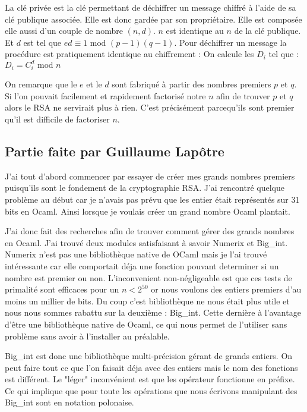 \documentclass[a4paper,12pt]{article}
\begin{document}
		La clé privée est la clé permettant de déchiffrer un message chiffré à l'aide de sa clé publique associée. Elle est donc gardée par son propriétaire. Elle est composée elle aussi d'un couple de nombre $(n,d)$. $n$ est identique au $n$ de la clé publique. Et $d$ est tel que $ed \equiv 1 \textrm{ mod } (p - 1)(q - 1)$. Pour déchiffrer un message la procédure est pratiquement identique au chiffrement : On calcule les $D_{i}$ tel que : $D_{i} = C_{i}^d \textrm{ mod } n$
		
		On remarque que le $e$ et le $d$ sont fabriqué à partir des nombres premiers $p$ et $q$. Si l'on pouvait facilement et rapidement factorisé notre $n$ afin de trouver $p$ et $q$ alors le RSA ne servirait plus à rien. C'est précisément parcequ'ils sont premier qu'il est difficile de factoriser $n$.  
		
		\subsection{Partie faite par Guillaume Lap\^{o}tre}
			J'ai tout d'abord commencer par essayer de créer mes grands nombres premiers puisqu'ils sont le fondement de la 
		cryptographie RSA. J'ai rencontré quelque problème au début car je n'avais pas prévu que les entier était représentés sur 
		31 bits en Ocaml. Ainsi lorsque je voulais créer un grand nombre Ocaml plantait.
		
		J'ai donc fait des recherches afin de 
		trouver comment gérer des grands nombres en Ocaml. J'ai trouvé deux modules satisfaisant à savoir Numerix et Big\_int. Numerix
		n'est pas une bibliothèque native de OCaml mais je l'ai trouvé intéressante car elle comportait déja une fonction pouvant  		
		determiner si un nombre est premier ou non. L'inconvenient non-négligeable est que ces tests de primalité sont efficaces pour 
		un $n < 2^{50}$ or nous voulons des entiers premiers d'au moins un millier de bits. Du coup c'est bibliothèque ne nous était 
		plus utile et nous nous sommes rabattu sur la deuxième : Big\_int. Cette dernière à l'avantage d'être une bibliothèque native 
		de Ocaml, ce qui nous permet de l'utiliser sans problème sans avoir à l'installer au préalable.
		
		Big\_int est donc une bibliothèque multi-précision gérant de grands entiers. On peut faire tout ce que l'on faisait déja avec 
		des entiers mais le nom des fonctions est différent. Le "léger" inconvénient est que les opérateur fonctionne en préfixe. Ce 
		qui implique que pour toute les opérations que nous écrivons manipulant des Big\_int sont en notation polonaise. 
		
\end{document}
